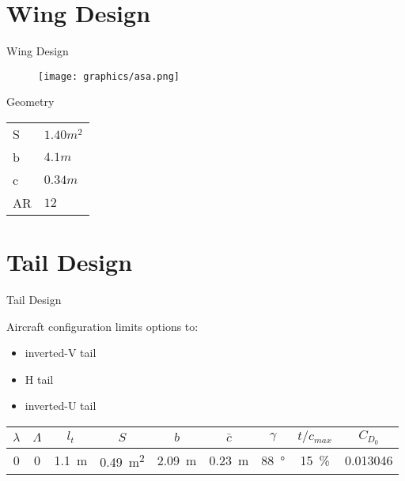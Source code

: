 \section{Wing Design}
\begin{frame}{Wing Design}

   \begin{figure}
        \texttt{[image: graphics/asa.png]}
    \end{figure} 
   
\begin{minipage}[t]{0.35\linewidth}
\begin{block}{Geometry}
    \centering
    \begin{tabularx}{\linewidth}{XX}
    S & $1.40 m^2$ \\
    b & $4.1 m$ \\
    c & $0.34 m$ \\
    AR & $12$ \\
    \end{tabularx}
\end{block}   
\end{minipage}
\end{frame}


\section{Tail Design}
\begin{frame}{Tail Design}
    \begin{minipage}[t]{0.5\textwidth}
        Aircraft configuration limits options to:
        \begin{itemize}
            \item inverted-V tail \Checkmark
            \item H tail
            \item inverted-U tail
        \end{itemize} 
    \end{minipage}%
    \begin{minipage}[t]{0.5\textwidth}
    \end{minipage}%
    \vfill
    \renewcommand{\arraystretch}{1.3}
    \centering
    \begin{tabular}{ccccccccc}
        $\lambda$ & $\Lambda$ & $l_t$& $S$ & $b$ & $\bar{c}$ & $\gamma$ & $t/c_{max}$ & $C_{D_{0}}$ \tabularnewline
        \hline 
        0 & 0 & \SI{1.1}{\meter} & \SI{0.49}{\meter\squared} & \SI{2.09}{\meter} & \SI{0.23}{\meter} & \SI{88}{\degree} & \SI{15}{\percent} & 0.013046\tabularnewline
    \end{tabular}
    \renewcommand{\arraystretch}{1}
\end{frame}
